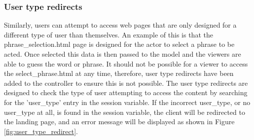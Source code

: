 \begin{figure}[h!]
\end{figure}
\newpage

\subsubsection{User type redirects}
Similarly, users can attempt to access web pages that are only designed for a different type of user than themselves. An example of this is that the phrase\_selection.html page is designed for the actor to select a phrase to be acted. Once selected this data is then passed to the model and the viewers are able to guess the word or phrase. It should not be possible for a viewer to access the select\_phrase.html at any time, therefore, user type redirects have been added to the controller to ensure this is not possible. The user type redirects are designed to check the type of user attempting to access the content by searching for the 'user\_type' entry in the session variable. If the incorrect user\_type, or no user\_type at all, is found in the session variable, the client will be redirected to the landing page, and an error message will be displayed as shown in Figure \ref{fig:user_type_redirect}.

